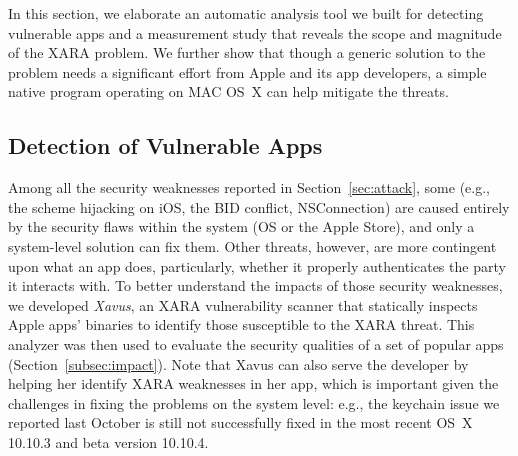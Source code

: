 \documentclass{article}
\newcommand{\ignore}[1]{}
\begin{document}
\ignore{Our security analysis on the Apple platforms show that their isolation protection (including sandboxing and other security policies enforced within the OS, and the security checks performed by the Apple Stores) can be circumvented by the knowledgeable adversary.  Still less clear here are the impacts of such security weaknesses, which depend on how likely real-world apps can be exploited through the weaknesses and what the consequences will be. Also important here is the effort that can be made to mitigate this new threat.  }In this section, we elaborate an automatic analysis tool we built for detecting vulnerable apps and a measurement study that reveals the scope and magnitude of the XARA problem.  We further show that though a generic solution to the problem needs a significant effort from Apple and its app developers, a simple native program operating on MAC OS~X can help mitigate the threats.

\subsection{Detection of Vulnerable Apps}
\label{subsec:detect}


Among all the security weaknesses reported in Section~\ref{sec:attack}, some (e.g., the scheme hijacking on iOS, the BID conflict, NSConnection) are caused entirely by the security flaws within the system (OS or the Apple Store), and only a system-level solution can fix them. Other threats, however, are more contingent upon what an app does, particularly, whether it properly authenticates the party it interacts with.  To better understand the impacts of those security weaknesses, we developed \textit{Xavus}, an XARA vulnerability scanner that statically inspects Apple apps' binaries to identify those susceptible to the XARA threat\ignore{, that is, the ones utilizing various less protected channels (Section~\ref{sec:attack}) without proper authentication in place}. This analyzer was then used to evaluate the security qualities of a set of popular apps\ignore{ on the Apple platforms} (Section~\ref{subsec:impact}). Note that Xavus can also serve the developer by helping her identify XARA weaknesses in her app, which is important given the challenges in fixing the problems on the system level: e.g., the keychain issue we reported last October is still not successfully fixed in the most recent OS~X 10.10.3 and beta version 10.10.4.
\end{document}

